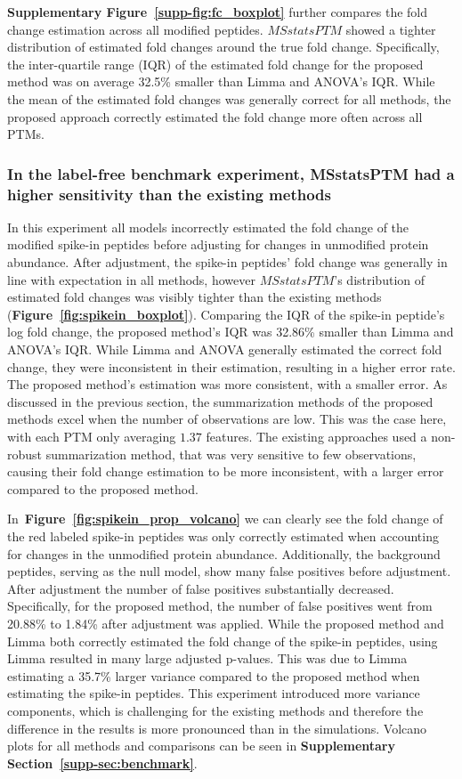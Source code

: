 \documentclass[mcp]{article}
\numberwithin{table}{section}
\def\figref#1{{\bf Figure~\ref{fig:#1}}}
\begin{document}
{\bf Supplementary Figure~\ref{supp-fig:fc_boxplot}} further compares the fold change estimation across all modified peptides. $MSstatsPTM$ showed a tighter distribution of estimated fold changes around the true fold change. Specifically, the inter-quartile range (IQR) of the estimated fold change for the proposed method was on average 32.5\% smaller than Limma and ANOVA's IQR. While the mean of the estimated fold changes was generally correct for all methods, the proposed approach correctly estimated the fold change more often across all PTMs.

\subsubsection*{In the label-free benchmark experiment, MSstatsPTM had a higher sensitivity than the existing methods}

In this experiment all models incorrectly estimated the fold change of the modified spike-in peptides before adjusting for changes in unmodified protein abundance. After adjustment, the spike-in peptides' fold change was generally in line with expectation in all methods, however $MSstatsPTM$'s distribution of estimated fold changes was visibly tighter than the existing methods (\figref{spikein_boxplot}). Comparing the IQR of the spike-in peptide's log fold change, the proposed method's IQR was 32.86\% smaller than Limma and ANOVA's IQR. While Limma and ANOVA generally estimated the correct fold change, they were inconsistent in their estimation, resulting in a higher error rate. The proposed method's estimation was more consistent, with a smaller error. As discussed in the previous section, the summarization methods of the proposed methods excel when the number of observations are low. This was the case here, with each PTM only averaging $1.37$ features. The existing approaches used a non-robust summarization method, that was very sensitive to few observations, causing their fold change estimation to be more inconsistent, with a larger error compared to the proposed method.

In~\figref{spikein_prop_volcano} we can clearly see the fold change of the red labeled spike-in peptides was only correctly estimated when accounting for changes in the unmodified protein abundance. Additionally, the background peptides, serving as the null model, show many false positives before adjustment. After adjustment the number of false positives substantially decreased. Specifically, for the proposed method, the number of false positives went from 20.88\% to 1.84\% after adjustment was applied. While the proposed method and Limma both correctly estimated the fold change of the spike-in peptides, using Limma resulted in many large adjusted p-values. This was due to Limma estimating a 35.7\% larger variance compared to the proposed method when estimating the spike-in peptides. This experiment introduced more variance components, which is challenging for the existing methods and therefore the difference in the results is more pronounced than in the simulations. Volcano plots for all methods and comparisons can be seen in {\bf Supplementary Section~\ref{supp-sec:benchmark}}.
\end{document}
